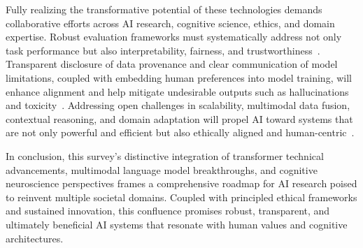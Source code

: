 \documentclass[sigconf]{acmart}
\begin{document}
Fully realizing the transformative potential of these technologies demands collaborative efforts across AI research, cognitive science, ethics, and domain expertise. Robust evaluation frameworks must systematically address not only task performance but also interpretability, fairness, and trustworthiness~\cite{ref36}. Transparent disclosure of data provenance and clear communication of model limitations, coupled with embedding human preferences into model training, will enhance alignment and help mitigate undesirable outputs such as hallucinations and toxicity~\cite{ref39,ref41}. Addressing open challenges in scalability, multimodal data fusion, contextual reasoning, and domain adaptation will propel AI toward systems that are not only powerful and efficient but also ethically aligned and human-centric~\cite{ref40,ref41}.

In conclusion, this survey’s distinctive integration of transformer technical advancements, multimodal language model breakthroughs, and cognitive neuroscience perspectives frames a comprehensive roadmap for AI research poised to reinvent multiple societal domains. Coupled with principled ethical frameworks and sustained innovation, this confluence promises robust, transparent, and ultimately beneficial AI systems that resonate with human values and cognitive architectures.



\end{document}
